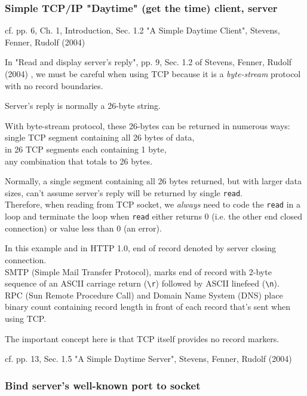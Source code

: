 \documentclass[10pt]{amsart}
\begin{document}
\begin{multicols*}{2}
\subsubsection{Simple TCP/IP "Daytime" (get the time) client, server}

cf. pp. 6, Ch. 1, Introduction, Sec. 1.2 "A Simple Daytime Client", Stevens, Fenner, Rudolf (2004) \cite{SFR2004}

In "Read and display server's reply", pp. 9, Sec. 1.2 of Stevens, Fenner, Rudolf (2004) \cite{SFR2004}, we must be careful when using TCP because it is a \emph{byte-stream} protocol with no record boundaries. 

Server's reply is normally a 26-byte string.

With byte-stream protocol, these 26-bytes can be returned in numerous ways: \\
single TCP segment containing all 26 bytes of data, \\
in 26 TCP segments each containing 1 byte, \\
any combination that totals to 26 bytes.

Normally, a single segment containing all 26 bytes returned, but with larger data sizes, can't assume server's reply will be returned by single \verb|read|. \\
Therefore, when reading from TCP socket, we \emph{always} need to code the \verb|read| in a loop and terminate the loop when \verb|read| either returns 0 (i.e. the other end closed connection) or value less than 0 (an error).

In this example and in HTTP 1.0, end of record denoted by server closing connection. \\
SMTP (Simple Mail Transfer Protocol), marks end of record with 2-byte sequence of an ASCII carriage return (\verb|\r|) followed by ASCII linefeed (\verb|\n|). \\
RPC (Sun Remote Procedure Call) and Domain Name System (DNS) place binary count containing record length in front of each record that's sent when using TCP.

The important concept here is that TCP itself provides no record markers.

cf. pp. 13, Sec. 1.5 "A Simple Daytime Server", Stevens, Fenner, Rudolf (2004) \cite{SFR2004}

\subsubsection{Bind server's well-known port to socket}


\end{multicols*}
\end{document}
